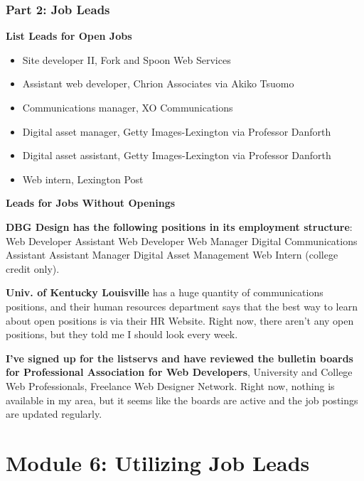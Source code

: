 \subsubsection*{Part 2: Job Leads}
 \textbf{List Leads for Open Jobs}
 \begin{itemize}
\item Site developer II, Fork and Spoon Web Services
\item Assistant web developer, Chrion Associates via Akiko Tsuomo
\item Communications manager, XO Communications
\item Digital asset manager, Getty Images-Lexington via Professor Danforth
\item Digital asset assistant, Getty Images-Lexington via Professor Danforth
\item Web intern, Lexington Post 
\end{itemize}

\textbf{Leads for Jobs Without Openings}

\textbf{DBG Design has the following positions in its employment structure}: 
\break Web Developer
\break Assistant Web Developer
\break Web Manager
\break Digital Communications Assistant
\break Assistant Manager
\break Digital Asset Management
\break Web Intern (college credit only).

\textbf{Univ. of Kentucky Louisville} has a huge quantity of communications positions, and their human resources department says that the best way to learn about open positions is via their HR Website. Right now, there aren't any open positions, but they told me I should look every week.

\textbf{I've signed up for the listservs and have reviewed the bulletin boards for Professional Association for Web Developers}, University and College Web Professionals, Freelance Web Designer Network. Right now, nothing is available in my area, but it seems like the boards are active and the job postings are updated regularly.
  
\pagebreak \section*{Module 6:	Utilizing Job Leads}
\noindent\makebox[\textwidth]{\rule{\linewidth}{0.4pt}}  \localtableofcontents 
\noindent\makebox[\textwidth]{\rule{\linewidth}{0.4pt}} 


